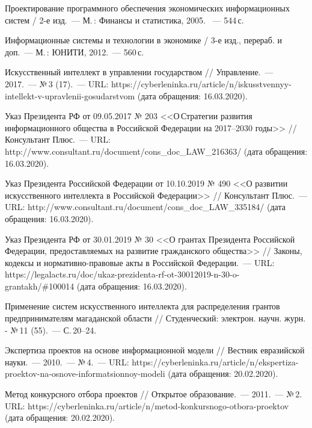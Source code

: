 \begin{thebibliography}{99}
\bibitem{} Проектирование программного обеспечения экономических информационных систем / 2-е изд.~--- М.\,: Финансы и статистика, 2005. ~--- 544\,с.

\bibitem{} Информационные системы и технологии в экономике / 3-е изд., перераб. и доп.~--- М.\,: ЮНИТИ, 2012.~--- 560\,с.

\bibitem{} Искусственный интеллект в управлении государством // Управление.~--- 2017.~--- №\,3 (17).~--- URL: https://cyberleninka.ru/article/n/iskusstvennyy-intellekt-v-upravlenii-gosudarstvom (дата обращения: 16.03.2020).

\bibitem{}Указ Президента РФ от 09.05.2017 № 203 <<О\,Стратегии развития информационного общества в Российской Федерации на 2017--2030 годы>> // Консультант Плюс.~--- URL: http://www.consultant.ru/document/cons\_doc\_LAW\_216363/ (дата обращения: 16.03.2020).

\bibitem{}Указ Президента Российской Федерации от 10.10.2019 № 490 <<О развитии искусственного интеллекта в Российской Федерации>> // Консультант Плюс.~--- URL: http://www.consultant.ru/document/cons\_doc\_LAW\_335184/ (дата обращения: 16.03.2020).

\bibitem{}Указ Президента РФ от 30.01.2019 № 30 <<О грантах Президента Российской Федерации, предоставляемых на развитие гражданского общества>> // Законы, кодексы и нормативно-правовые акты в Российской Федерации.~--- URL: https://legalacts.ru/doc/ukaz-prezidenta-rf-ot-30012019-n-30-o-grantakh/\#100014 (дата обращения: 16.03.2020).

\bibitem{} Применение систем искусственного интеллекта для распределения грантов предпринимателям магаданской области // Студенческий: электрон. научн. журн. - №\,11 (55).~--- С.\,20--24.

\bibitem{} Экспертиза проектов на основе информационной модели // Вестник евразийской науки.~--- 2010.~--- №\,4.~--- URL: https://cyberleninka.ru/article/n/ekspertiza-proektov-na-osnove-informatsionnoy-modeli (дата обращения: 20.02.2020).

\bibitem{} Метод конкурсного отбора проектов // Открытое образование.~--- 2011.~--- №\,2. URL: https://cyberleninka.ru/article/n/metod-konkursnogo-otbora-proektov (дата обращения: 20.02.2020).


\end{thebibliography}
